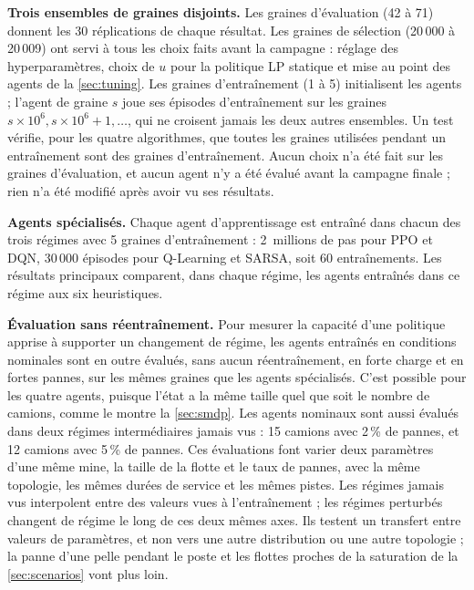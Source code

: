 \documentclass[11pt,a4paper]{article}
\newif\ifrevmarks
\newcommand{\revtag}[1]{\ifrevmarks\textsuperscript{\textcolor{red!70!black}{\scriptsize[#1]}}\fi}
\newenvironment{revbloc}[1]{\par\ifrevmarks\color{revcolor}\noindent\revtag{#1}\ \fi}{\par}
\newif\ifcorrmarks
\newcommand{\corr}[1]{\ifcorrmarks\textcolor{corrcolor}{#1}\else#1\fi}
\begin{document}
\begin{revbloc}{M1, M7, m19, A, v3}
\textbf{Trois ensembles de graines disjoints.} Les graines d'évaluation (42 à 71) donnent les 30 réplications de chaque résultat. Les graines de sélection (20\,000 à 20\,009) ont servi à tous les choix faits avant la campagne : réglage des hyperparamètres, choix de $u$ pour la politique \corr{LP statique} et mise au point des agents de la \cref{sec:tuning}. Les graines d'entraînement (1 à 5) initialisent les agents ; l'agent de graine $s$ joue ses épisodes d'entraînement sur les graines $s \times 10^6, s \times 10^6 + 1, \ldots$, qui ne croisent jamais les deux autres ensembles. Un test vérifie, pour les quatre algorithmes, que toutes les graines utilisées pendant un entraînement sont des graines d'entraînement. Aucun choix n'a été fait sur les graines d'évaluation, et aucun agent n'y a été évalué avant la campagne finale ; rien n'a été modifié après avoir vu ses résultats.

\textbf{Agents spécialisés.} Chaque agent d'apprentissage est entraîné dans chacun des trois régimes avec 5 graines d'entraînement : 2~millions de pas pour PPO et DQN, 30\,000 épisodes pour Q-Learning et SARSA, soit 60 entraînements. Les résultats principaux comparent, dans chaque régime, les agents entraînés dans ce régime aux six heuristiques.

\textbf{Évaluation sans réentraînement.} Pour mesurer la capacité d'une politique apprise à supporter un changement de régime, les agents entraînés en conditions nominales sont en outre évalués, sans aucun réentraînement, en forte charge et en fortes pannes, sur les mêmes graines que les agents spécialisés. C'est possible pour les quatre agents, puisque l'état a la même taille quel que soit le nombre de camions, comme le montre la \cref{sec:smdp}. Les agents nominaux sont aussi évalués dans deux régimes intermédiaires jamais vus : 15 camions avec 2\,\% de pannes, et 12 camions avec 5\,\% de pannes. \corr{Ces évaluations font varier deux paramètres d'une même mine, la taille de la flotte et le taux de pannes, avec la même topologie, les mêmes durées de service et les mêmes pistes. Les régimes jamais vus interpolent entre des valeurs vues à l'entraînement ; les régimes perturbés changent de régime le long de ces deux mêmes axes. Ils testent un transfert entre valeurs de paramètres, et non vers une autre distribution ou une autre topologie ; la panne d'une pelle pendant le poste et les flottes proches de la saturation de la \cref{sec:scenarios} vont plus loin.}


\end{revbloc}
\end{document}
